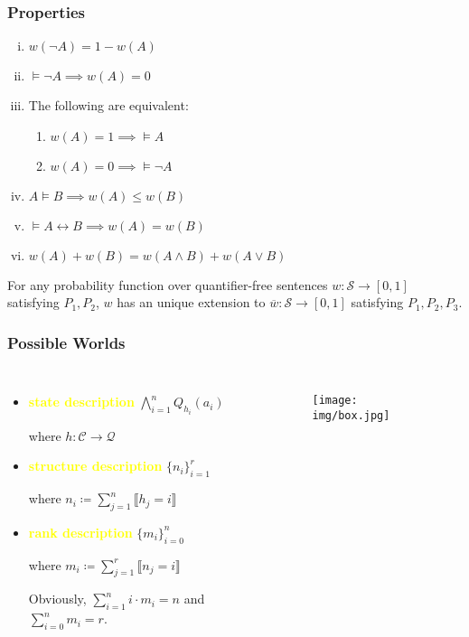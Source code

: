\documentclass[UTF8,11pt,colorlinks,compress,openany]{beamer}%
\begin{document}
\begin{frame}\frametitle{Properties}
\setlength\abovedisplayskip{0pt}
\setlength\belowdisplayskip{0pt}
	\begin{theorem}
		\begin{enumerate}[(i)]
			\item $w(\neg A)=1-w(A)$
			\item $\vDash\neg A\implies w(A)=0$
			\item The following are equivalent:
			\begin{enumerate}[1.]
				\item $w(A)=1 \implies \vDash A$
				\item $w(A)=0 \implies \vDash\neg A$
			\end{enumerate}
			\item $A\vDash B\implies w(A)\leq w(B)$
			\item $\vDash A\leftrightarrow B\implies w(A)=w(B)$
			\item $w(A)+w(B)=w(A\wedge B)+w(A\vee B)$
		\end{enumerate}
	\end{theorem}
	\begin{theorem}\label{extensionthm}
		For any probability function over quantifier-free sentences $w: \mathcal{S}\to[0,1]$ satisfying $P_1,P_2$, $w$ has an unique extension to $\overline{w}:\mathcal{S}\to[0,1]$ satisfying $P_1,P_2,P_3$.
	\end{theorem}
\end{frame}

\begin{frame}\frametitle{Possible Worlds}
\begin{columns}[onlytextwidth]
\begin{itemize}
\item \textcolor{yellow}{\textbf{state description}} $\bigwedge\limits_{i=1}^n Q_{h_i}(a_i)$

	where $h: \mathcal{C}\to \mathcal{Q}$
\item \textcolor{yellow}{\textbf{structure description}} $\{n_i\}_{i=1}^r$

	where $n_i\coloneqq \sum\limits_{j=1}^n\llbracket h_j=i\rrbracket$
\item \textcolor{yellow}{\textbf{rank description}} $\{m_i\}_{i=0}^n$

	where $m_i\coloneqq \sum\limits_{j=1}^r\llbracket n_j=i\rrbracket$
	
	Obviously, $\sum\limits_{i=1}^n i\cdot m_i=n$ and $\sum\limits_{i=0}^n m_i=r$.
\end{itemize}
	\begin{figure}
		\texttt{[image: img/box.jpg]}
	\end{figure}
\end{columns}
\end{frame}
\end{document}
